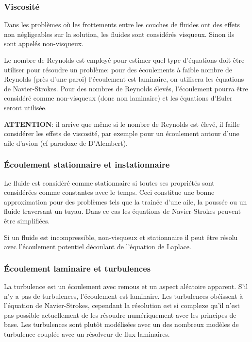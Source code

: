 \documentclass[10pt,a4paper]{article}
\begin{document}
\subsubsection{Viscosité}
Dans les problèmes où les frottements entre les couches de fluides ont des effets non négligeables sur la solution, les fluides sont considérés visqueux. Sinon ils sont appelés non-visqueux. 

Le nombre de Reynolds\cite{nbreynolds} est employé pour estimer quel type d'équations doit être utiliser pour résoudre un problème: pour des écoulements à faible nombre de Reynolds (près d'une paroi) l'écoulement est laminaire, on utilisera les équations de Navier-Strokes. Pour des nombres de Reynolds élevés, l'écoulement pourra être considéré comme non-visqueux (donc non laminaire) et les équations d'Euler seront utilisée.

\textbf{ATTENTION}: il arrive que même si le nombre de Reynolds est élevé, il faille considérer les effets de viscosité, par exemple pour un écoulement autour d'une aile d'avion (cf paradoxe de D'Alembert\cite{paradoxealembert}).

\subsubsection{Écoulement stationnaire et instationnaire}
Le fluide est considéré comme stationnaire si toutes ses propriétés sont considérées comme constantes avec le temps. Ceci constitue une bonne approximation pour des problèmes tels que la trainée d'une aile, la poussée ou un fluide traversant un tuyau. Dans ce cas les équations de Navier-Strokes peuvent être simplifiées.

Si un fluide est incompressible, non-visqueux et stationnaire il peut être résolu avec l'écoulement potentiel découlant de l'équation de Laplace.

\subsubsection{Écoulement laminaire et turbulences}
La turbulence est un écoulement avec remous et un aspect aléatoire apparent. S'il n'y a pas de turbulences, l'écoulement est laminaire. Les turbulences obéissent à l'équation de Navier-Strokes, cependant la résolution est si complexe qu'il n'est pas possible actuellement de les résoudre numériquement avec les principes de base. Les turbulences sont plutôt modélisées avec un des nombreux modèles de turbulence couplée avec un résolveur de flux laminaires.
\end{document}
